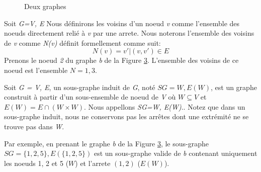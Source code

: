\documentclass[12pt,a4paper]{article}
\begin{document}
\begin{figure}[h]
  \begin{subfigure}[b]{0.50\textwidth}
    \centering
        \caption{}
        \label{fig:x g1}
  \end{subfigure}
  \begin{subfigure}[b]{0.50\textwidth}
    \centering
        \caption{}
        \label{fig:x g2}
  \end{subfigure}
  \caption{Deux graphes}
  \label{fig:x exemple1}
\end{figure}

Soit \emph{G=V, E} Nous définirons les voisins d'un noeud \emph{v} comme l'ensemble des noeuds directement relié à \emph{v} par une arrete. Nous noterons l'ensemble des voisins de \emph{v} comme \emph{N(v)} définit formellement comme suit:
\begin{equation}
N(v) = { v' | (v, v') \in E }
\end{equation}
Prenons le noeud \emph{2} du graphe \emph{b} de la Figure \ref{fig:x exemple1}. L'ensemble des voisins de ce noeud est l'ensemble \(N = {1, 3}\).


Soit \emph{G = V, E}, un sous-graphe induit de \emph{G}, noté \(SG = W, E(W)\), est un graphe construit à partir d'un sous-ensemble de noeud de \emph{V} où $ W \subseteq V $ et $ E(W) = E \cap (W \times W) $. Nous appellons \emph{SG=W, E(W)}..
Notez que dans un sous-graphe induit, nous ne conservons pas les arrêtes dont une extrémité ne se trouve pas dans \emph{W}.

Par exemple, en prenant le graphe \textit{b} de la Figure \ref{fig:x exemple1}, le sous-graphe \(SG=\{1, 2, 5\}, E(\{1, 2, 5\})\) est un sous-graphe valide de \textit{b} contenant uniquement les noeuds 1, 2 et 5 (\(W\)) et l'arrete \((1,2)\) (\(E(W)\)).
\end{document}
